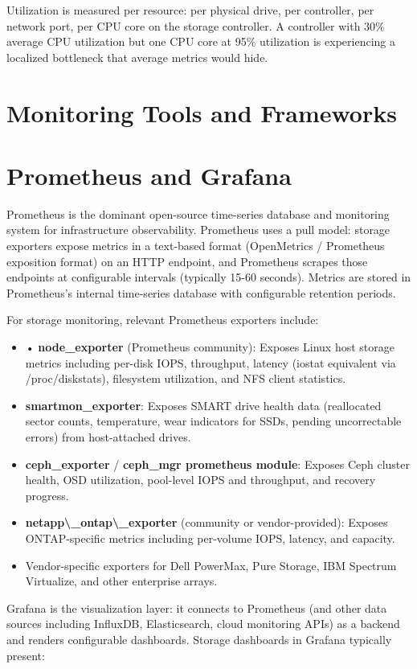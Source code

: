Utilization is measured per resource: per physical drive, per controller, per network port, per CPU core on the storage controller. A controller with 30\% average CPU utilization but one CPU core at 95\% utilization is experiencing a localized bottleneck that average metrics would hide.

\section{Monitoring Tools and Frameworks}
\section{Prometheus and Grafana}
Prometheus is the dominant open-source time-series database and monitoring system for infrastructure observability. Prometheus uses a pull model: storage exporters expose metrics in a text-based format (OpenMetrics / Prometheus exposition format) on an HTTP endpoint, and Prometheus scrapes those endpoints at configurable intervals (typically 15-60 seconds). Metrics are stored in Prometheus's internal time-series database with configurable retention periods.

For storage monitoring, relevant Prometheus exporters include:

\begin{itemize}
  \item • \textbf{node\_exporter} (Prometheus community): Exposes Linux host storage metrics including per-disk IOPS, throughput, latency (iostat equivalent via /proc/diskstats), filesystem utilization, and NFS client statistics.
  \item \textbf{smartmon\_exporter}: Exposes SMART drive health data (reallocated sector counts, temperature, wear indicators for SSDs, pending uncorrectable errors) from host-attached drives.
  \item \textbf{ceph\_exporter} / \textbf{ceph\_mgr prometheus module}: Exposes Ceph cluster health, OSD utilization, pool-level IOPS and throughput, and recovery progress.
  \item \textbf{netapp\textbackslash\_ontap\textbackslash\_exporter} (community or vendor-provided): Exposes ONTAP-specific metrics including per-volume IOPS, latency, and capacity.
  \item Vendor-specific exporters for Dell PowerMax, Pure Storage, IBM Spectrum Virtualize, and other enterprise arrays.
\end{itemize}

Grafana is the visualization layer: it connects to Prometheus (and other data sources including InfluxDB, Elasticsearch, cloud monitoring APIs) as a backend and renders configurable dashboards. Storage dashboards in Grafana typically present:

